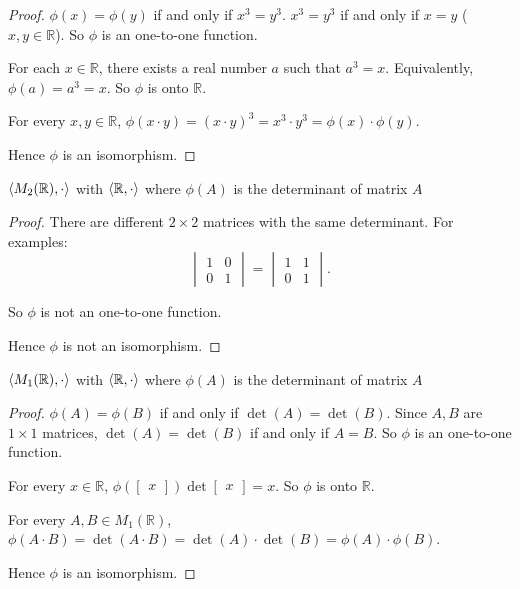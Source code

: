 \begin{proof}
    $\phi(x) = \phi(y)$ if and only if $x^{3} = y^{3}$. $x^{3} = y^{3}$ if and only if $x = y$ ($x, y\in\mathbb{R}$). So $\phi$ is an one-to-one function.

    For each $x\in\mathbb{R}$, there exists a real number $a$ such that $a^{3} = x$. Equivalently, $\phi(a) = a^{3} = x$. So $\phi$ is onto $\mathbb{R}$.

    For every $x, y\in\mathbb{R}$, $\phi(x\cdot y) = {(x\cdot y)}^{3} = x^{3}\cdot y^{3} = \phi(x)\cdot\phi(y)$.

    Hence $\phi$ is an isomorphism.
\end{proof}

\begin{exercise}
    $\left\langle{M_{2}(\mathbb{R}), \cdot}\right\rangle$ with $\left\langle{\mathbb{R},\cdot}\right\rangle$ where $\phi(A)$ is the determinant of matrix $A$
\end{exercise}

\begin{proof}
    There are different $2\times 2$ matrices with the same determinant. For examples:
    \[
        \begin{vmatrix}
            1 & 0 \\
            0 & 1
        \end{vmatrix}
        =
        \begin{vmatrix}
            1 & 1 \\
            0 & 1
        \end{vmatrix}.
    \]

    So $\phi$ is not an one-to-one function.

    Hence $\phi$ is not an isomorphism.
\end{proof}

\begin{exercise}
    $\left\langle{M_{1}(\mathbb{R}),\cdot}\right\rangle$ with $\left\langle{\mathbb{R},\cdot}\right\rangle$ where $\phi(A)$ is the determinant of matrix $A$
\end{exercise}

\begin{proof}
    $\phi(A) = \phi(B)$ if and only if $\det(A) = \det(B)$. Since $A, B$ are $1\times 1$ matrices, $\det(A) = \det(B)$ if and only if $A = B$. So $\phi$ is an one-to-one function.

    For every $x\in\mathbb{R}$, $\phi(\begin{bmatrix}x\end{bmatrix})\det\begin{bmatrix}x\end{bmatrix} = x$. So $\phi$ is onto $\mathbb{R}$.

    For every $A, B\in M_{1}(\mathbb{R})$, $\phi(A\cdot B) = \det(A\cdot B) = \det(A)\cdot\det(B) = \phi(A)\cdot\phi(B)$.

    Hence $\phi$ is an isomorphism.
\end{proof}

